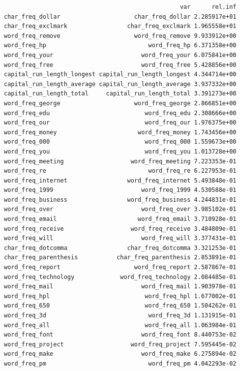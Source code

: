 \documentclass[
  11pt,
]{article}
\begin{document}
\begin{verbatim}
                                                  var      rel.inf
char_freq_dollar                     char_freq_dollar 2.285917e+01
char_freq_exclmark                 char_freq_exclmark 1.965558e+01
word_freq_remove                     word_freq_remove 9.933912e+00
word_freq_hp                             word_freq_hp 6.371358e+00
word_freq_your                         word_freq_your 6.075841e+00
word_freq_free                         word_freq_free 5.428856e+00
capital_run_length_longest capital_run_length_longest 4.344714e+00
capital_run_length_average capital_run_length_average 3.937332e+00
capital_run_length_total     capital_run_length_total 3.391273e+00
word_freq_george                     word_freq_george 2.866851e+00
word_freq_edu                           word_freq_edu 2.308666e+00
word_freq_our                           word_freq_our 1.976375e+00
word_freq_money                       word_freq_money 1.743456e+00
word_freq_000                           word_freq_000 1.559673e+00
word_freq_you                           word_freq_you 1.013728e+00
word_freq_meeting                   word_freq_meeting 7.223353e-01
word_freq_re                             word_freq_re 6.227953e-01
word_freq_internet                 word_freq_internet 5.493848e-01
word_freq_1999                         word_freq_1999 4.530588e-01
word_freq_business                 word_freq_business 4.244831e-01
word_freq_over                         word_freq_over 3.985102e-01
word_freq_email                       word_freq_email 3.710928e-01
word_freq_receive                   word_freq_receive 3.484809e-01
word_freq_will                         word_freq_will 3.377431e-01
char_freq_dotcomma                 char_freq_dotcomma 3.321253e-01
char_freq_parenthesis           char_freq_parenthesis 2.853891e-01
word_freq_report                     word_freq_report 2.587867e-01
word_freq_technology             word_freq_technology 2.084485e-01
word_freq_mail                         word_freq_mail 1.903978e-01
word_freq_hpl                           word_freq_hpl 1.677002e-01
word_freq_650                           word_freq_650 1.504262e-01
word_freq_3d                             word_freq_3d 1.131915e-01
word_freq_all                           word_freq_all 1.063984e-01
word_freq_font                         word_freq_font 8.440753e-02
word_freq_project                   word_freq_project 7.595445e-02
word_freq_make                         word_freq_make 6.275894e-02
word_freq_pm                             word_freq_pm 4.042293e-02

\end{verbatim}
\end{document}
